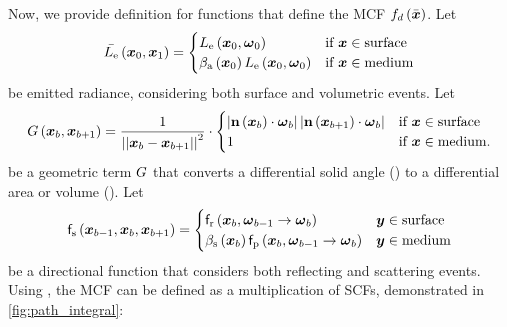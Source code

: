 \documentclass{article}
\begin{document}
Now, we provide definition for functions that define the \ac{MCF} $f_{d}\left({\Bar{\boldsymbol{x}}}\right)$. Let
\begin{equation}
\label{eq:general_radiance}
\Bar{L_{\text{e}}}\left({\boldsymbol{x}_0,\boldsymbol{x}_1}\right)= 
\begin{cases}
L_{\text{e}}\left({\boldsymbol{x}_0, \boldsymbol{\omega}_0}\right) & \text{if } \boldsymbol{x} \in \text{surface} \\
\beta_{\text{a}}\left({\boldsymbol{x}_0}\right)L_{\text{e}}\left({\boldsymbol{x}_0, \boldsymbol{\omega}_0}\right) & \text{if } \boldsymbol{x} \in \text{medium}
\end{cases}
\end{equation}
be emitted radiance, considering both surface and volumetric events.
Let 
\begin{equation}
\label{eq:geomterm}
G\left({\boldsymbol{x}_{b},\boldsymbol{x}_{b+1}}\right)=\dfrac{1}{\left|\left| {\boldsymbol{x}_{b}-\boldsymbol{x}_{b+1}} \right|\right|^2}\cdot
\begin{cases}
\left| {\textbf{n}\left({\boldsymbol{x}_{b}}\right)\cdot\boldsymbol{\omega}_{b}} \right|\left| {\textbf{n}\left({\boldsymbol{x}_{b+1}}\right)\cdot\boldsymbol{\omega}_{b}} \right| & \text{if } \boldsymbol{x}\in \text{surface} \\
1 & \text{if } \boldsymbol{x} \in  \text{medium}.
\end{cases}  
\end{equation}
be a geometric term $G$ that converts a differential solid angle (\eqsnopar{\ref{eq:inscattered_radiance},\ref{eq:surface_rendering}}) to a differential area or volume (\eqnopar{\ref{eq:path_integral_formulation}}). Let
\begin{equation}
\label{eq:fs}
\mathsf{f}_{\text{s}}\left({\boldsymbol{x}_{b-1},\boldsymbol{x}_{b},\boldsymbol{x}_{b+1}}\right)=
\begin{cases}
\mathsf{f}_{\text{r}}\left({\boldsymbol{x}_{b},\boldsymbol{\omega}_{b-1}\rightarrow\boldsymbol{\omega}_{b}}\right) & \boldsymbol{y} \in \text{surface} \\
\beta_{\text{s}}\left({\boldsymbol{x}_{b}}\right)\mathsf{f}_{\text{p}}\left({\boldsymbol{x}_{b},\boldsymbol{\omega}_{b-1}\rightarrow\boldsymbol{\omega}_{b}}\right) &  \boldsymbol{y} \in  \text{medium}
\end{cases}
\end{equation}
be a directional function that considers both reflecting and scattering events.
Using \eqs{\ref{eq:general_radiance}-\ref{eq:fs}}, the \ac{MCF} can be defined as a multiplication of \ac{SCF}s, demonstrated in \fig\ref{fig:path_integral}:
\end{document}
